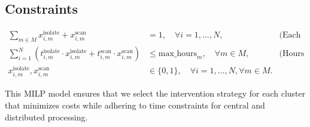 \documentclass{article}
\begin{document}
\subsection*{Constraints}
\begin{align}
\sum_{m \in M} x_{i, m}^{\text{isolate}} + x_{i, m}^{\text{scan}} &= 1, \quad \forall i = 1, \ldots, N, & \text{(Each cluster must have one intervention)} \\
\sum_{i=1}^{N} \left( t_{i, m}^{\text{isolate}} \cdot x_{i, m}^{\text{isolate}} + t_{i, m}^{\text{scan}} \cdot x_{i, m}^{\text{scan}} \right) &\leq \text{max\_hours}_m, \quad \forall m \in M, & \text{(Hours constraint for each method)} \\
x_{i, m}^{\text{isolate}}, x_{i, m}^{\text{scan}} &\in \{0, 1\}, \quad \forall i = 1, \ldots, N, \forall m \in M.
\end{align}

This MILP model ensures that we select the intervention strategy for each cluster that minimizes costs while adhering to time constraints for central and distributed processing.
\end{document}
